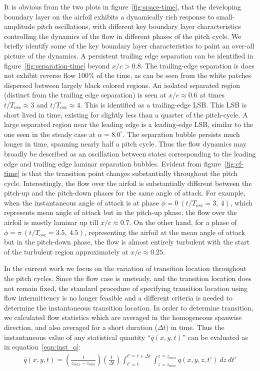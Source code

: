 It is obvious from the two plots in figure~\ref{fig:space-time}, that the developing boundary layer on the airfoil exhibits a dynamically rich response to small-amplitude pitch oscillations, with different key boundary layer characteristics controlling the dynamics of the flow in different phases of the pitch cycle. We briefly identify some of the key boundary layer characteristics to paint an over-all picture of the dynamics. A persistent trailing edge separation can be identified in figure~\ref{fig:separation-time} beyond $x/c>0.8$. The trailing-edge separation is does not exhibit reverse flow 100\% of the time, as can be seen from the white patches dispersed between largely black colored regions. An isolated separated region (distinct from the trailing edge separation) is seen at $x/c\approx0.6$ at times $t/T_{osc}\approx3$ and $t/T_{osc}\approx4$. This is identified as a trailing-edge LSB. This LSB is short lived in time, existing for slightly less than a quarter of the pitch-cycle. A large separated region near the leading edge is a leading-edge LSB, similar to the one seen in the steady case at $\alpha=8.0^{\circ}$. The separation bubble persists much longer in time, spanning nearly half a pitch cycle. Thus the flow dynamics may broadly be described as an oscillation between states corresponding to the leading edge and trailing edge laminar separation bubbles. Evident from figure~\ref{fig:cf-time} is that the transition point changes substantially throughout the pitch cycle. Interestingly, the flow over the airfoil is substantially different between the pitch-up and the pitch-down phases for the same angle of attack. For example, when the instantaneous angle of attack is at phase $\phi=0\ (t/T_{osc}=3,\ 4)$, which represents mean angle of attack but in the pitch-up phase, the flow over the airfoil is mostly laminar up till $x/c\approx0.7$. On the other hand, for a phase of $\phi=\pi\ (t/T_{osc}=3.5,\ 4.5)$, representing the airfoil at the mean angle of attack but in the pitch-down phase, the flow is almost entirely turbulent with the start of the turbulent region approximately at $x/c\approx0.25$.

In the current work we focus on the variation of transition location throughout the pitch cycles. Since the flow case is unsteady, and the transition location does not remain fixed, the standard procedure of specifying transition location using flow intermittency is no longer feasible and a different criteria is needed to determine the instantaneous transition location. In order to determine transition, we calculated flow statistics which are averaged in the homogeneous spanwise direction, and also averaged for a short duration ($\Delta t$) in time. Thus the instantaneous value of any statistical quantity ``$\overline{q}(x,y,t)$'' can be evaluated as in equation~\ref{eqn:inst_q}:
\begin{align}
	\overline{q}(x,y,t) = \left(\frac{1}{z_{max}-z_{min}}\right)\left(\frac{1}{\Delta t}\right)\int_{t'=t}^{t'=t+\Delta t}\int_{z=z_{min}}^{z=z_{max}}q(x,y,z,t')\ dz\ dt'
	\label{eqn:inst_q}
\end{align}

